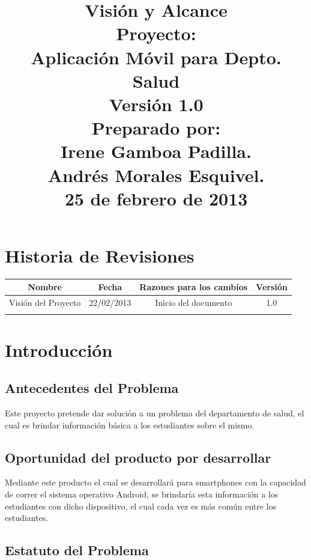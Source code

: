 \documentclass[12pt]{article}
\title{\begin{flushright}\textbf{Visi\'on y Alcance} \\[0.7in] 
		Proyecto: \\[0.2in]
		\textbf{Aplicaci\'on M\'ovil para Depto. Salud}\\[0.7in]
		Versi\'on 1.0 \\[0.7in]
		Preparado por: \\[0.2in]
		\textbf{Irene Gamboa Padilla.\\
		Andr\'es Morales Esquivel.} \\[0.7in]
		25 de febrero de 2013
		\end{flushright}}
\author{}
\date{}
\begin{document}
\maketitle
\newpage
\renewcommand{\contentsname}{Tabla de Contenido}
\tableofcontents


\section{Historia de Revisiones}

\begin{tabular}{|c|c|c|c|}
\hline
	\textbf{Nombre} & \textbf{Fecha} & \textbf{Razones para los cambios} & \textbf{Versi\'on}\\
\hline
	Visi\'on del Proyecto & 22/02/2013 & Inicio del documento & 1.0\\
\hline
	 &  &  & \\
\hline
\end{tabular}

\newpage

\section{Introducci\'on}

\subsection{Antecedentes del Problema}

Este proyecto pretende dar soluci\'on a un problema del departamento de salud, el cual es brindar informaci\'on b\'asica a los estudiantes sobre el mismo.

\subsection{Oportunidad del producto por desarrollar}

Mediante este producto el cual se desarrollar\'a para smartphones con la capacidad de correr el sistema operativo Android, se brindar\'ia esta informaci\'on a los estudiantes con dicho dispositivo, el cual cada vez es m\'as com\'un entre los estudiantes.

\subsection{Estatuto del Problema}
\end{document}
